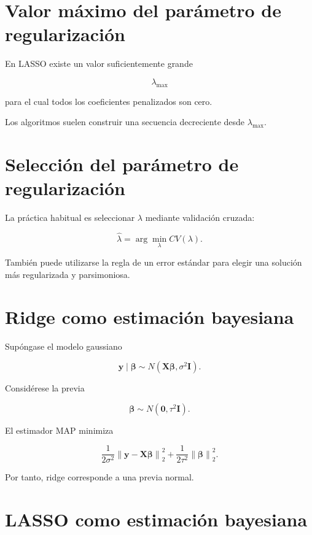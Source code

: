 \documentclass[
  spanish,
  11pt,
  letterpaper,
  DIV=11,
  numbers=noendperiod]{scrreprt}
\theoremstyle{definition}
\theoremstyle{plain}
\theoremstyle{definition}
\theoremstyle{remark}
\begin{document}
\section{Valor máximo del parámetro de
regularización}\label{valor-muxe1ximo-del-paruxe1metro-de-regularizaciuxf3n}

En LASSO existe un valor suficientemente grande

\[
\lambda_{\max}
\]

para el cual todos los coeficientes penalizados son cero.

Los algoritmos suelen construir una secuencia decreciente desde
\(\lambda_{\max}\).

\section{Selección del parámetro de
regularización}\label{selecciuxf3n-del-paruxe1metro-de-regularizaciuxf3n}

La práctica habitual es seleccionar \(\lambda\) mediante validación
cruzada:

\[
\widehat{\lambda}
=
\arg\min_{\lambda}
CV(\lambda).
\]

También puede utilizarse la regla de un error estándar para elegir una
solución más regularizada y parsimoniosa.

\section{Ridge como estimación
bayesiana}\label{ridge-como-estimaciuxf3n-bayesiana}

Supóngase el modelo gaussiano

\[
\mathbf{y}
\mid
\boldsymbol{\beta}
\sim
N(
\mathbf{X}\boldsymbol{\beta},
\sigma^2\mathbf{I}
).
\]

Considérese la previa

\[
\boldsymbol{\beta}
\sim
N(
\mathbf{0},
\tau^2\mathbf{I}
).
\]

El estimador MAP minimiza

\[
\frac{1}{2\sigma^2}
\left\|
\mathbf{y}
-
\mathbf{X}\boldsymbol{\beta}
\right\|_2^2
+
\frac{1}{2\tau^2}
\left\|
\boldsymbol{\beta}
\right\|_2^2.
\]

Por tanto, ridge corresponde a una previa normal.

\section{LASSO como estimación
bayesiana}\label{lasso-como-estimaciuxf3n-bayesiana}
\end{document}
